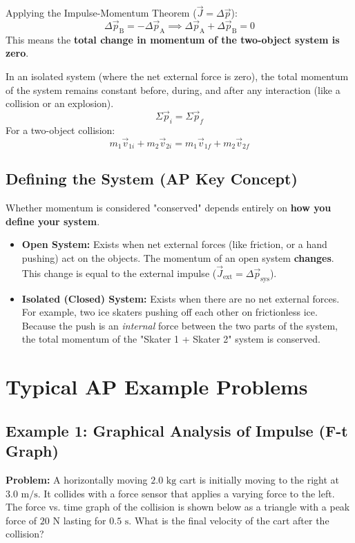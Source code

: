 \documentclass{article}
\begin{document}
Applying the Impulse-Momentum Theorem ($\vec{J} = \Delta\vec{p}$):
\begin{equation}
\Delta\vec{p}_{\text{B}} = -\Delta\vec{p}_{\text{A}} \implies \Delta\vec{p}_{\text{A}} + \Delta\vec{p}_{\text{B}} = 0
\end{equation}
This means the \textbf{total change in momentum of the two-object system is zero}. 

\begin{tcolorbox}[colback=blue!5, colframe=blue!40!black, title=Law of Conservation of Momentum]
In an isolated system (where the net external force is zero), the total momentum of the system remains constant before, during, and after any interaction (like a collision or an explosion).
\begin{equation}
\Sigma \vec{p}_i = \Sigma \vec{p}_f
\end{equation}
For a two-object collision:
\begin{equation}
m_1\vec{v}_{1i} + m_2\vec{v}_{2i} = m_1\vec{v}_{1f} + m_2\vec{v}_{2f}
\end{equation}
\end{tcolorbox}

\subsection{Defining the System (AP Key Concept)}
Whether momentum is considered "conserved" depends entirely on \textbf{how you define your system}.
\begin{itemize}
    \item \textbf{Open System:} Exists when net external forces (like friction, or a hand pushing) act on the objects. The momentum of an open system \textbf{changes}. This change is equal to the external impulse ($\vec{J}_{\text{ext}} = \Delta\vec{p}_{\text{sys}}$).
    \item \textbf{Isolated (Closed) System:} Exists when there are no net external forces. For example, two ice skaters pushing off each other on frictionless ice. Because the push is an \emph{internal} force between the two parts of the system, the total momentum of the "Skater 1 + Skater 2" system is conserved.
\end{itemize}

\newpage
\section{Typical AP Example Problems}

\subsection*{Example 1: Graphical Analysis of Impulse (F-t Graph)}
\textbf{Problem:} A horizontally moving $2.0 \text{ kg}$ cart is initially moving to the right at $3.0 \text{ m/s}$. It collides with a force sensor that applies a varying force to the left. The force vs. time graph of the collision is shown below as a triangle with a peak force of $20 \text{ N}$ lasting for $0.5 \text{ s}$. What is the final velocity of the cart after the collision?
\end{document}
